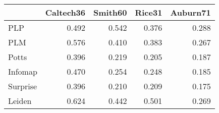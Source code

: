 \begin{tabular}{lrrrr}
\toprule
{} & Caltech36 & Smith60 & Rice31 & Auburn71 \\
\midrule
PLP      &     0.492 &   0.542 &  0.376 &    0.288 \\
PLM      &     0.576 &   0.410 &  0.383 &    0.267 \\
Potts    &     0.396 &   0.219 &  0.205 &    0.187 \\
Infomap  &     0.470 &   0.254 &  0.248 &    0.185 \\
Surprise &     0.396 &   0.210 &  0.209 &    0.175 \\
Leiden   &     0.624 &   0.442 &  0.501 &    0.269 \\
\bottomrule
\end{tabular}
